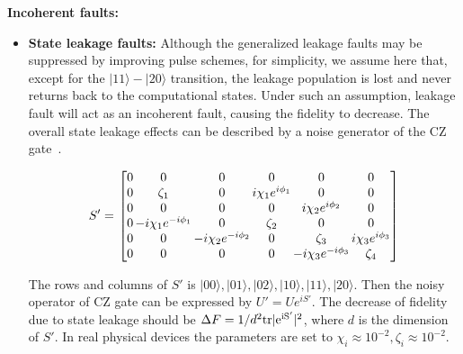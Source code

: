 \documentclass[conference, 9pt]{IEEEtran}
\begin{document}
\textbf{Incoherent faults:}

\begin{itemize}
 \item \textbf{State leakage faults:} Although the generalized leakage faults may be suppressed by improving pulse schemes, for simplicity, we assume here that, except for the $|11\rangle-|20\rangle$ transition, the leakage population is lost and never returns back to the computational states. Under such an assumption, leakage fault will act as an incoherent fault, causing the fidelity to decrease. The overall state leakage effects can be described by a noise generator of the CZ gate~\cite{Ghosh_2013}. 
 
    \begin{align}
    \setlength{\arraycolsep}{0.8pt}
    S' = \begin{array}{lc}
    \begin{bmatrix}
    0 & 0 & 0 & 0& 0 & 0  \\
    0 & \zeta_1 & 0 & i\chi_1 e^{i\phi_1}& 0 & 0 \\
    0 & 0 & 0 & 0& i\chi_2 e^{i\phi_2} & 0 \\
    0 & -i\chi_1 e^{-i\phi_1} & 0 & \zeta_2 & 0 & 0 \\
    0 & 0 & -i\chi_2 e^{-i\phi_2} & 0& \zeta_3 & i\chi_3 e^{i\phi_3}   \\
    0 & 0 & 0 & 0 & -i \chi_3 e^{-i\phi_3} & \zeta_4 \\
    \end{bmatrix}
    \end{array}
    \end{align}

    \medskip
    
    
    The rows and columns of $S'$ is
    $|00\rangle,|01\rangle,|02\rangle,|10\rangle,|11\rangle,|20\rangle$. Then the noisy operator of CZ gate can be expressed by $U' = Ue^{iS'}$. The decrease of fidelity due to state leakage should be $\Delta F = 1/d^2 \rm{tr}|e^{iS'}|^2$, where $d$ is the dimension of $S'$. In real physical devices the parameters are set to $\chi_i \approx 10^{-2}, \zeta_i \approx 10^{-2}$. 
    

\end{itemize}
\end{document}
